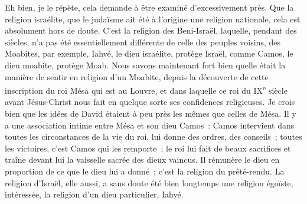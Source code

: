 \documentclass[french,twoside]{book} %
\newcommand\orgName[1]{#1}
\newcommand\persName[1]{#1}
\newcommand\placeName[1]{#1}
\begin{document}
Eh bien, je le répète, cela demande à être examiné d’excessivement près. Que la religion israélite, que le judaïsme ait été à l’origine une religion nationale, cela est absolument hors de doute. C’est la religion des {\orgName Beni-Israël}, laquelle, pendant des siècles, n’a pas été essentiellement différente de celle des peuples voisins, des {\orgName Moabites}, par exemple, {\persName Iahvé}, le dieu israélite, protège {\placeName Israël}, comme {\persName Camos}, le dieu moabite, protège {\placeName Moab}. Nous savons maintenant fort bien quelle était la manière de sentir en religion d’un Moabite, depuis la découverte de cette inscription du {\persName roi Mésa} qui est au {\orgName Louvre}, et dans laquelle ce roi du IX\textsuperscript{e} siècle avant Jésus-Christ nous fait en quelque sorte ses confidences religieuses. Je crois bien que les idées de David étaient à peu près les mêmes que celles de {\persName Mésa}. Il y a une association intime entre {\persName Mésa} et son {\persName dieu Camos} : {\persName Camos} intervient dans toutes les circonstances de la vie du roi, lui donne des ordres, des conseils ; toutes les victoires, c’est {\persName Camos} qui les remporte ; le roi lui fait de beaux sacrifices et traîne devant lui la vaisselle sacrée des dieux vaincus. Il rémunère le dieu en proportion de ce que le dieu lui a donné ; c’est la religion du prêté-rendu. La religion d’{\orgName Israël}, elle aussi, a sans doute été bien longtemps une religion égoïste, intéressée, la religion d’un dieu particulier, {\persName Iahvé}.\par
\end{document}
